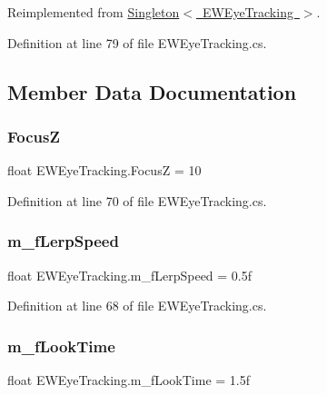 Reimplemented from \mbox{\hyperlink{class_singleton_aac558b29781a363c0845b0359c8f85ff}{Singleton$<$ E\+W\+Eye\+Tracking $>$}}.



Definition at line 79 of file E\+W\+Eye\+Tracking.\+cs.



\subsection{Member Data Documentation}
\mbox{\label{class_e_w_eye_tracking_ae2b04e1a210ad9de92b0ac4d4292e19b}} 
\subsubsection{\texorpdfstring{FocusZ}{FocusZ}}
{\footnotesize\ttfamily float E\+W\+Eye\+Tracking.\+FocusZ = 10\hspace{0.3cm}{\ttfamily [static]}}



Definition at line 70 of file E\+W\+Eye\+Tracking.\+cs.

\mbox{\label{class_e_w_eye_tracking_aa8454c8a2216b073f86f50e0c2f80400}} 
\subsubsection{\texorpdfstring{m\+\_\+f\+Lerp\+Speed}{m\_fLerpSpeed}}
{\footnotesize\ttfamily float E\+W\+Eye\+Tracking.\+m\+\_\+f\+Lerp\+Speed = 0.\+5f}



Definition at line 68 of file E\+W\+Eye\+Tracking.\+cs.

\mbox{\label{class_e_w_eye_tracking_a30bedfa38908a52193c7c6ce130461ea}} 
\subsubsection{\texorpdfstring{m\+\_\+f\+Look\+Time}{m\_fLookTime}}
{\footnotesize\ttfamily float E\+W\+Eye\+Tracking.\+m\+\_\+f\+Look\+Time = 1.\+5f}



